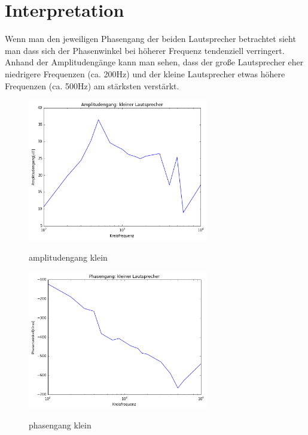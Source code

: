 \documentclass[TGAI_Laborbericht.tex]{subfiles}
\begin{document}
\section{Interpretation}
\label{chap:VERSUCH_2_INTERPRETATION}
Wenn man den jeweiligen Phasengang der beiden Lautsprecher betrachtet sieht man dass sich der Phasenwinkel bei höherer Frequenz tendenziell verringert.
Anhand der Amplitudengänge kann man sehen, dass der große Lautsprecher eher niedrigere Frequenzen (ca. 200Hz) und der kleine Lautsprecher etwas höhere Frequenzen (ca. 500Hz) am stärksten verstärkt.

\begin{figure}[H]
	\includegraphics[width=0.7\textwidth]{media/amplitudengang_klein.png}
	\label{amplitudengang klein}
	\caption{amplitudengang klein}
\end{figure}

\begin{figure}[H]
	\includegraphics[width=0.7\textwidth]{media/phasengang_klein.png}
	\label{phasengang klein}
	\caption{phasengang klein}
\end{figure}
\end{document}
